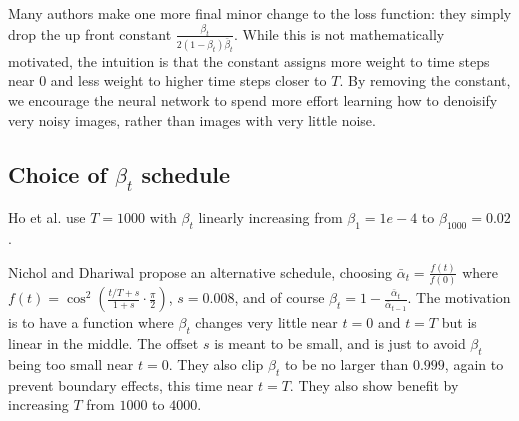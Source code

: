\documentclass[11pt,dvipsnames]{article}
\begin{document}
Many authors make one more final minor change to the loss function: they simply drop the up front constant $\frac{\beta_t}{2(1 - \beta_t)\bar\beta_t}$.
While this is not mathematically motivated, the intuition is that the constant assigns more weight to time steps near $0$ and less weight to higher time steps closer to $T$.
By removing the constant, we encourage the neural network to spend more effort learning how to denoisify very noisy images, rather than images with very little noise.

\subsection{Choice of $\beta_t$ schedule}
Ho et al. use $T = 1000$ with $\beta_t$ linearly increasing from $\beta_1 = 1e-4$ to $\beta_{1000} = 0.02$.

Nichol and Dhariwal propose an alternative schedule, choosing $\bar\alpha_t = \frac{f(t)}{f(0)}$ where $f(t) = \cos^2 \left( \frac{t/T + s}{1 + s} \cdot \frac{\pi}{2} \right)$, $s = 0.008$, and of course $\beta_t = 1 - \frac{\bar\alpha_t}{\bar\alpha_{t-1}}$.
The motivation is to have a function where $\beta_t$ changes very little near $t=0$ and $t=T$ but is linear in the middle.
The offset $s$ is meant to be small, and is just to avoid $\beta_t$ being too small near $t=0$.
They also clip $\beta_t$ to be no larger than $0.999$, again to prevent boundary effects, this time near $t=T$.
They also show benefit by increasing $T$ from $1000$ to $4000$.
\end{document}
